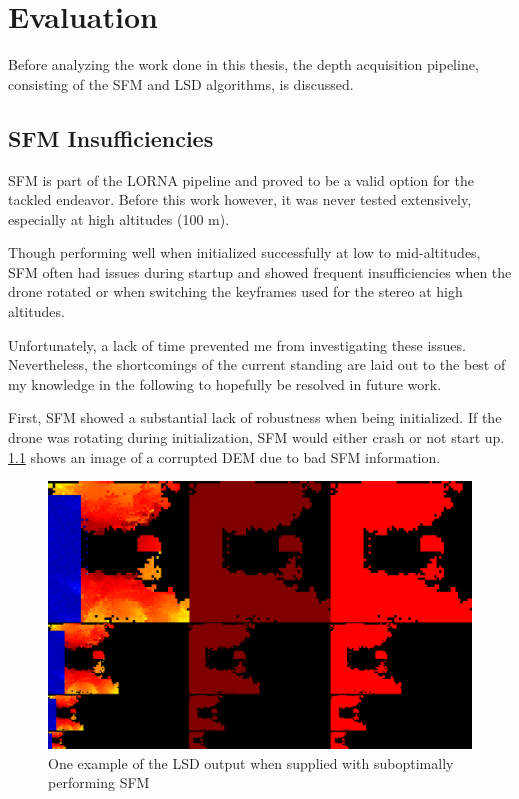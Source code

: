 \chapter{Evaluation}
\label{chapter:evaluation}

Before analyzing the work done in this thesis, the depth acquisition pipeline, consisting of the SFM and LSD algorithms, is discussed.

\section{SFM Insufficiencies}\label{subsec:sfm_insufficiencies}
SFM is part of the LORNA pipeline and proved to be a valid option for the tackled endeavor. Before this work however, it was never tested extensively, especially at high altitudes (100 m).

Though performing well when initialized successfully at low to mid-altitudes, SFM often had issues during startup and showed frequent insufficiencies when the drone rotated or when switching the keyframes used for the stereo at high altitudes.

Unfortunately, a lack of time prevented me from investigating these issues. Nevertheless, the shortcomings of the current standing are laid out to the best of my knowledge in the following to hopefully be resolved in future work.

First, SFM showed a substantial lack of robustness when being initialized. If the drone was rotating during initialization, SFM would either crash or not start up. \cref{fig:SFM_issue_1} shows an image of a corrupted DEM due to bad SFM information.


\begin{figure}[h]
    \centering
    \includegraphics[scale=0.25]{images/evaluation/SFM_issues/Screenshot from 2024-06-19 20-16-22.png}
    \caption{One example of the LSD output when supplied with suboptimally performing SFM}
    \label{fig:SFM_issue_1}
\end{figure} 

